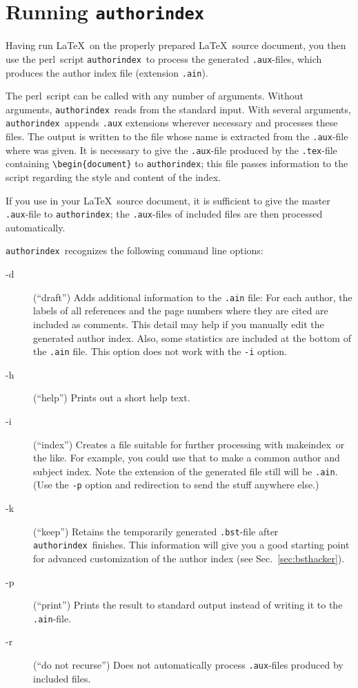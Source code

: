 \documentclass[a4paper]{article}
\newcommand{\package}[1]{\textsf{#1}}
\newcommand{\mkindex}{\package{makeindex}}
\newcommand{\perl}{\textsf{perl}}
\newcommand{\file}[1]{\texttt{#1}}
\newcommand{\fnext}[1]{\file{.#1}}
\newcommand{\cmdline}[1]{\texttt{#1}}
\newcommand{\option}[1]{\cmdline{#1}}
\newcommand{\aiperl}{\cmdline{authorindex}}
\newcommand{\ltxinp}[1]{\texttt{\string#1}}
\begin{document}
\section{Running \aiperl}
\label{sec:Runai}

Having run \LaTeX\ on the properly prepared \LaTeX\ source document, you then
use the \perl\ script \aiperl\ to process the generated \fnext{aux}-files,
which produces the author index file (extension \fnext{ain}).

The \perl\ script can be called with any number of arguments.  Without
arguments, \aiperl\ reads from the standard input. With several arguments,
\aiperl\ appends \fnext{aux} extensions wherever necessary and processes these
files. The output is written to the file whose name is extracted from the
\fnext{aux}-file where \ltxinp{\printauthorindex} was given. It is necessary to
give the \fnext{aux}-file produced by the \fnext{tex}-file containing
\verb|\begin{document}| to \aiperl; this file passes information to the script
regarding the style and content of the index.
  
If you use \ltxinp{} in your \LaTeX\ source document, it is
sufficient to give the master \fnext{aux}-file to \aiperl; the
\fnext{aux}-files of included files are then processed automatically.

\aiperl\ recognizes the following command line options:
\begin{description}
\item[-d] (``draft'') Adds additional information to the \fnext{ain} file: For
  each author, the labels of all references and the page numbers where they are
  cited are included as comments. This detail may help if you manually edit the
  generated author index. Also, some statistics are included at the bottom of
  the \fnext{ain} file. This option does not work with the \option{-i} option.
\item[-h] (``help'') Prints out a
  short help text.
\item[-i] (``index'') Creates a file suitable for further processing with
  \mkindex\ or the like. For example, you could use that to make a common
  author and subject index. Note the extension of the generated file still will
  be \fnext{ain}.  (Use the \option{-p} option and redirection to send the
  stuff anywhere else.)
\item[-k] (``keep'') Retains the temporarily generated \fnext{bst}-file after
  \aiperl\ finishes. This information will give you a good starting point for
  advanced customization of the author index (see Sec.~\ref{sec:bsthacker}).
\item[-p] (``print'') Prints the result to standard output instead of writing
  it to the \fnext{ain}-file.
\item[-r] (``do not recurse'') Does not automatically process \fnext{aux}-files
  produced by included files.
\end{description}
\end{document}
